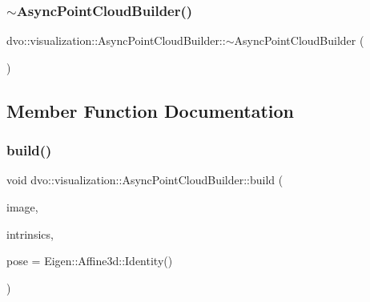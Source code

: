 \subsubsection{\texorpdfstring{$\sim$\+Async\+Point\+Cloud\+Builder()}{~AsyncPointCloudBuilder()}}
{\footnotesize\ttfamily dvo\+::visualization\+::\+Async\+Point\+Cloud\+Builder\+::$\sim$\+Async\+Point\+Cloud\+Builder (\begin{DoxyParamCaption}{ }\end{DoxyParamCaption})\hspace{0.3cm}{\ttfamily [virtual]}}



\subsection{Member Function Documentation}
\mbox{\label{classdvo_1_1visualization_1_1_async_point_cloud_builder_a8347f241fd74e390aedaebfe4ce5c619}} 
\subsubsection{\texorpdfstring{build()}{build()}}
{\footnotesize\ttfamily void dvo\+::visualization\+::\+Async\+Point\+Cloud\+Builder\+::build (\begin{DoxyParamCaption}\item[{const \mbox{\hyperlink{structdvo_1_1core_1_1_rgbd_image}{dvo\+::core\+::\+Rgbd\+Image}} \&}]{image,  }\item[{const \mbox{\hyperlink{structdvo_1_1core_1_1_intrinsic_matrix}{dvo\+::core\+::\+Intrinsic\+Matrix}} \&}]{intrinsics,  }\item[{const Eigen\+::\+Affine3d}]{pose = {\ttfamily Eigen\+:\+:Affine3d\+:\+:Identity()} }\end{DoxyParamCaption})}

\mbox{\label{classdvo_1_1visualization_1_1_async_point_cloud_builder_a64258774d1203a294842d2a45bccc121}} 
